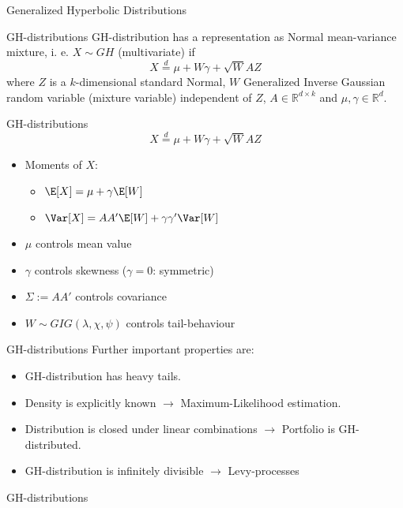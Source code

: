 {Generalized Hyperbolic Distributions}


{GH-distributions} GH-distribution has a
representation as Normal mean-variance mixture, i. e. $X\sim GH$
(multivariate) if
$$X\stackrel{d}{=}\mu+W\gamma+\sqrt{W}AZ$$
where $Z$ is a $k$-dimensional standard Normal, $W$ Generalized
Inverse Gaussian random variable (mixture variable) independent of
$Z$, $A\in\mathbb{R}^{d\times k}$ and $\mu, \gamma \in
\mathbb{R}^d$.


{GH-distributions} %
$$X\stackrel{d}{=}\mu+W\gamma+\sqrt{W}AZ$$
\begin{itemize}
\item Moments of $X$:
    \begin{itemize}
    \item $\E[X]=\mu+\gamma\E[W]$
    \item $\Var[X]=AA'\E[W]+\gamma\gamma'\Var[W]$\\[-1.5cm]
    \end{itemize}
\item $\mu$ controls mean value\\[-1.5cm]
\item $\gamma$ controls skewness ($\gamma=0$: symmetric)\\[-1.5cm]
\item $\Sigma:=AA'$ controls covariance\\[-1.5cm]
\item $W\sim GIG(\lambda,\chi,\psi)$ controls tail-behaviour
\end{itemize}


{GH-distributions} %
Further important properties
are: %
\begin{itemize}
\item GH-distribution has heavy tails. \item Density is explicitly
known $\rightarrow$ Maximum-Likelihood estimation. \item
Distribution is closed under linear combinations $\rightarrow$
Portfolio is GH-distributed. \item GH-distribution is infinitely
divisible $\rightarrow$ Levy-processes
\end{itemize}



{GH-distributions}

